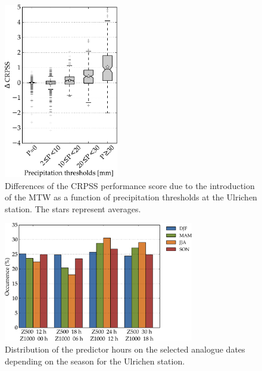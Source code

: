 \documentclass[hess, manuscript]{copernicus}
\begin{document}
	\begin{figure}[htb]
		\includegraphics[width=5cm]{figures/changes_CRPS_precip_threshold.pdf}
		\caption{Differences of the CRPSS performance score due to the introduction of the MTW as a function of precipitation thresholds at the Ulrichen station. The stars represent averages.}
		\label{fig:changes_CRPS_precip_threshold}
	\end{figure}
	
	\begin{figure}[htb]
		\includegraphics[width=8.3cm]{figures/hours_selection_per_season.pdf}
		\caption{Distribution of the predictor hours on the selected analogue dates depending on the season for the Ulrichen station.}
		\label{fig:hours_selection_per_season}
	\end{figure}
	
	
	\clearpage
	
\end{document}
